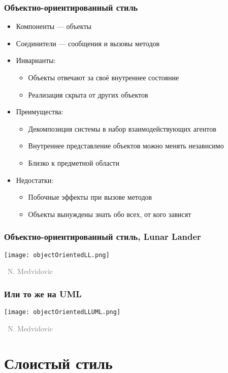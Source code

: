 \documentclass[xetex,mathserif,serif]{beamer}
\newcommand{\attribution}[1] {
	\vspace{-5mm}\begin{flushright}\begin{scriptsize}\textcolor{gray}{\textcopyright\, #1}\end{scriptsize}\end{flushright}
}
\begin{document}
	\begin{frame}
		\frametitle{Объектно-ориентированный стиль}
		\begin{itemize}
			\item Компоненты --- объекты
			\item Соединители --- сообщения и вызовы методов
			\item Инварианты:
			\begin{itemize}
				\item Объекты отвечают за своё внутреннее состояние
				\item Реализация скрыта от других объектов
			\end{itemize}
			\item Преимущества:
			\begin{itemize}
				\item Декомпозиция системы в набор взаимодействующих агентов
				\item Внутреннее представление объектов можно менять независимо
				\item Близко к предметной области
			\end{itemize}
			\item Недостатки:
			\begin{itemize}
				\item Побочные эффекты при вызове методов
				\item Объекты вынуждены знать обо всех, от кого зависят
			\end{itemize}
		\end{itemize}
	\end{frame}

	\begin{frame}
		\frametitle{Объектно-ориентированный стиль, Lunar Lander}
		\begin{center}
			\texttt{[image: objectOrientedLL.png]}
			\attribution{N. Medvidovic}
		\end{center}
	\end{frame}

	\begin{frame}
		\frametitle{Или то же на UML}
		\begin{center}
			\texttt{[image: objectOrientedLLUML.png]}
			\attribution{N. Medvidovic}
		\end{center}
	\end{frame}

	\section{Слоистый стиль}
\end{document}
